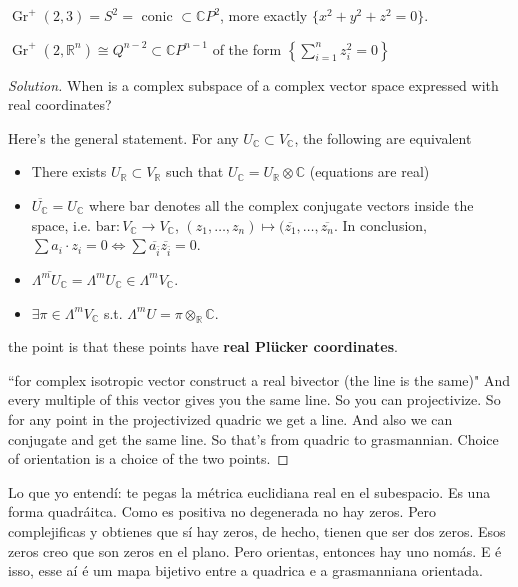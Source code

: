 \begin{example}\leavevmode
\(\operatorname{Gr}^+(2,3)=S^2=\) conic \(\subset\mathbb{C}P^{2}\), more exactly \(\{x^2+y^2+z^2=0\}\).
\end{example}

\begin{exercise}\leavevmode
\(\operatorname{Gr}^+(2,\mathbb{R}^n)\cong Q^{n-2}\subset \mathbb{C}P^{n-1}\) of the form \(\left\{\sum_{i=1}^n z_i^2=0\right\}\)
\end{exercise}

\begin{proof}[Solution]\leavevmode
When is a complex subspace of a complex vector space expressed with real coordinates?

Here's the general statement. For any \(U_\mathbb{C} \subset V_\mathbb{C}\), the following are equivalent
\begin{itemize}
\item There exists \(U_{\mathbb{R}} \subset V_\mathbb{R}\) such that \(U_\mathbb{C} = U_\mathbb{R} \otimes \mathbb{C}\) (equations are real)
\item \(\overline{U_\mathbb{C}}=U_\mathbb{C}\) where bar denotes all the complex conjugate vectors inside the space, i.e. \(\text{bar}:V_\mathbb{C} \to V_\mathbb{C} \), \((z_1,\ldots,z_n) \mapsto (\overline{z_1},\ldots,\overline{z_n}\). In conclusion, \(\sum a_i\cdot z_i=0 \iff \sum \overline{a_{\bar{i}}}\overline{z_{\bar{i}}}=0\).
\item \(\overline{\Lambda^{m}U_\mathbb{C}}=\Lambda^{m}U_\mathbb{C} \in \Lambda^{m}V_\mathbb{C}\).
\item \(\exists  \pi \in \Lambda^{m}V_\mathbb{C}\) s.t. \(\Lambda^{m}U = \pi \otimes_\mathbb{R} \mathbb{C}\).
\end{itemize}
the point is that these points have \textbf{real Plücker coordinates}.

``for complex isotropic vector construct a real bivector (the line is the same)" And every multiple of this vector gives you the same line. So you can projectivize. So for any point in the projectivized quadric we get a line. And also we can conjugate and get the same line. So that's from quadric to grasmannian. Choice of orientation is a choice of the two points.
\end{proof}

\begin{remark}[dani]\leavevmode
Lo que yo entendí: te pegas la métrica euclidiana real en el subespacio. Es una forma quadráitca. Como es positiva no degenerada no hay zeros. Pero complejificas y obtienes que sí hay zeros, de hecho, tienen que ser dos zeros. Esos zeros creo que son zeros en el plano. Pero orientas, entonces hay uno nomás. E é isso, esse aí é um mapa bijetivo entre a quadrica e a grasmanniana orientada.
\end{remark}

